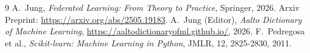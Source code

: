 \documentclass{article}
\begin{document}
\begin{thebibliography}{9}
	 A.~Jung, \textit{Federated Learning: From Theory to Practice}, Springer, 2026. Arxiv Preprint: \url{https://arxiv.org/abs/2505.19183}.
	 A.~Jung (Editor), \textit{Aalto Dictionary of Machine Learning}, \url{https://aaltodictionaryofml.github.io/}, 2026.
     F.~Pedregosa et al., \textit{Scikit-learn: Machine Learning in Python}, JMLR, 12, 2825-2830, 2011.
\end{thebibliography}
\end{document}
